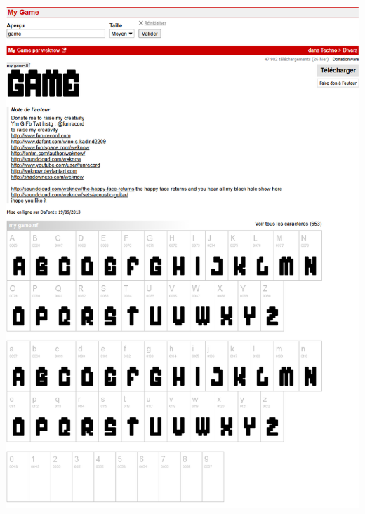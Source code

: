 \documentclass[12pt,a4paper]{report}
\begin{document}
\begin{center}

\includegraphics[scale=0.35]{Figure_My_Game.png} 

\end{center}
\end{document}
